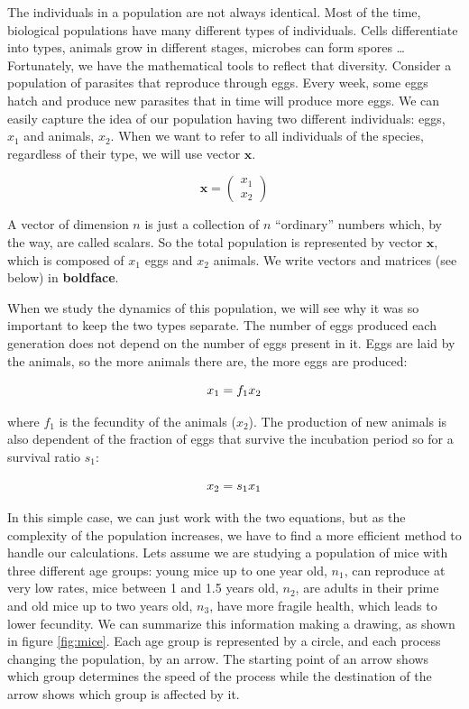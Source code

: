 \documentclass[12pt]{article}
\begin{document}
The  individuals in a population are not always identical. Most of the time, biological populations have many different types of individuals. Cells differentiate into types, animals grow in different stages, microbes can form spores \dots Fortunately, we have the mathematical tools to reflect that diversity. Consider a population of parasites that reproduce through eggs. Every week, some eggs hatch and produce new parasites that in time will produce more eggs. We can easily capture the idea of our population having two different individuals: eggs, $x_1$ and animals, $x_2$. When we want to refer to all individuals of the species, regardless of their type, we will use vector $\mathbf{x}$.

\begin{equation}
\mathbf{x} =\left( \begin{array}{c} x_1 \\  x_2 \end{array} \right)
\end{equation}

A vector of dimension $n$ is just a collection of $n$ ``ordinary'' numbers which, by the way, are called scalars. So the total population is represented by vector  $\mathbf{x}$, which is composed of $x_1$ eggs and $x_2$ animals. We write vectors and matrices (see below) in \textbf{boldface}.


When we study the dynamics of this population, we will see why it was so important to keep the two types separate. The number of eggs produced each generation does not depend on the number of eggs present in it. Eggs are laid by the animals, so the more animals there are, the more eggs are produced:

\begin{equation}
x_1 = f_{1} \\  x_2 
\end{equation}

where $f_1$ is the fecundity of the animals ($x_2$). The production of new animals is also dependent of the fraction of eggs that survive the incubation period so for a survival ratio $s_1$:

\begin{equation}
	x_2 = s_{1} \\  x_1 
\end{equation}

In this simple case, we can just work with the two equations, but as the complexity of the population increases, we have to find a more efficient method to handle our calculations. Lets assume we are studying a population of mice with three different age groups: young  mice up to one year old, $n_1$, can reproduce at very low rates, mice between 1 and 1.5 years old, $n_2$, are adults in their prime and old mice up to two years old, $n_3$, have more fragile health, which leads to lower fecundity. We can summarize this information making a drawing, as shown in figure \ref{fig:mice}. Each age group is represented by a circle, and each process changing the population, by an arrow. The starting point of an arrow shows which group determines the speed of the process while the  destination of the arrow shows which group is affected by it.
\end{document}

